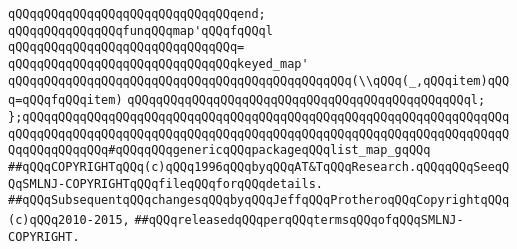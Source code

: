 \verb|qQQqqQQqqQQqqQQqqQQqqQQqqQQqqQQqend;|\newline
\newline
\verb|qQQqqQQqqQQqqQQqfunqQQqmap'qQQqfqQQql|\newline
\verb|qQQqqQQqqQQqqQQqqQQqqQQqqQQqqQQq=|\newline
\verb|qQQqqQQqqQQqqQQqqQQqqQQqqQQqqQQqkeyed_map'|\newline
\verb|qQQqqQQqqQQqqQQqqQQqqQQqqQQqqQQqqQQqqQQqqQQqqQQq(\\qQQq(_,qQQqitem)qQQq=qQQqfqQQqitem)|\newline
\verb|qQQqqQQqqQQqqQQqqQQqqQQqqQQqqQQqqQQqqQQqqQQqqQQql;|\newline
\newline
\verb|};qQQqqQQqqQQqqQQqqQQqqQQqqQQqqQQqqQQqqQQqqQQqqQQqqQQqqQQqqQQqqQQqqQQqqQQqqQQqqQQqqQQqqQQqqQQqqQQqqQQqqQQqqQQqqQQqqQQqqQQqqQQqqQQqqQQqqQQqqQQqqQQqqQQqqQQq#qQQqqQQqgenericqQQqpackageqQQqlist_map_gqQQq|\newline
\newline
\newline
\newline
\verb|##qQQqCOPYRIGHTqQQq(c)qQQq1996qQQqbyqQQqAT&TqQQqResearch.qQQqqQQqSeeqQQqSMLNJ-COPYRIGHTqQQqfileqQQqforqQQqdetails.|\newline
\verb|##qQQqSubsequentqQQqchangesqQQqbyqQQqJeffqQQqProtheroqQQqCopyrightqQQq(c)qQQq2010-2015,|\newline
\verb|##qQQqreleasedqQQqperqQQqtermsqQQqofqQQqSMLNJ-COPYRIGHT.|\newline


